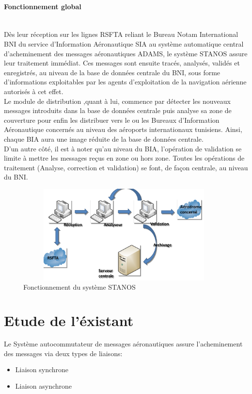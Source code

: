 \paragraph{Fonctionnement global}
~~\\

Dès leur réception sur les lignes RSFTA reliant le Bureau Notam International BNI du service d’Information Aéronautique SIA au système automatique central d’acheminement des messages aéronautiques ADAMS, le système STANOS assure leur traitement immédiat. Ces messages sont ensuite tracés, analysés, validés et enregistrés, au niveau de la base de données centrale du BNI, sous forme d’informations exploitables par les agents d’exploitation de la navigation aérienne  autorisés à cet effet.\\

Le module de distribution ,quant à lui, commence par détecter les nouveaux messages introduits dans la base de données centrale puis analyse sa zone de couverture pour enfin les distribuer vers le ou les Bureaux d’Information Aéronautique concernés au niveau des aéroports internationaux tunisiens. Ainsi, chaque BIA aura une image réduite de la base de données centrale.\\

D’un autre côté, il est à noter qu’au niveau du BIA, l’opération de validation se limite à mettre les messages reçus en zone ou hors zone. Toutes les opérations de traitement (Analyse, correction et validation) se font, de façon centrale, au niveau du BNI.\\


\begin{figure}[!h]
\begin{center}
\includegraphics[width=11cm,height=5cm]{existant/fnc.png}
\end{center}
\caption{Fonctionnement du système STANOS}
\end{figure}

\section{Etude de l'éxistant}
Le Système autocommutateur de messages aéronautiques assure l’acheminement des messages via deux types de liaisons:\\
\begin{itemize}
\item Liaison synchrone\\
\item Liaison asynchrone\\
\end{itemize}


